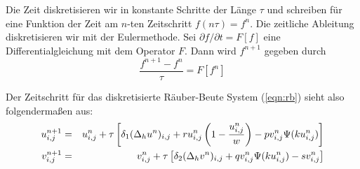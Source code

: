 \documentclass[english,10pt]{exam}
\begin{document}
Die Zeit diskretisieren wir in konstante Schritte der Länge $\tau$ und schreiben
für eine Funktion der Zeit am $n$-ten Zeitschritt $f(n \tau) = f^n$. Die zeitliche Ableitung diskretisieren
wir mit der Eulermethode. Sei $\partial f/\partial t = F[f]$ eine Differentialgleichung
mit dem Operator $F$. Dann wird $f^{n+1}$ gegeben durch
\begin{equation}
\label{eqn:dtime}
\frac{f^{n+1} - f^{n}}{\tau} = F[f^{n}]
\end{equation}


Der Zeitschritt für das diskretisierte Räuber-Beute System (\ref{eqn:rb}) sieht also folgendermaßen aus:
\begin{eqnarray}
\label{eqn:drb}
u_{i,j}^{n+1}  &=& u_{i,j}^n + \tau \left[ \delta_1 (\Delta_h u^n)_{i,j} + r u^n_{i,j} \left(1 - \frac{u^n_{i,j}}{w} \right) - p v^n_{i,j} \Psi(k u^n_{i,j}) \right] \\
v_{i,j}^{n+1}  &=& v_{i,j}^n + \tau \left[ \delta_2 (\Delta_h v^n)_{i,j} + q v^n_{i,j} \Psi(k u^n_{i,j}) - s v^n_{i,j} \right] \notag 
\end{eqnarray}

\clearpage
\end{document}
